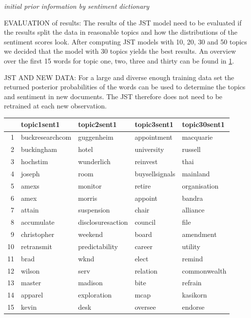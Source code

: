\textit{initial prior information by sentiment dictionary}

EVALUATION of results: The results of the JST model need to be evaluated if the results split the data in reasonable topics and how the distributions of the sentiment scores look. After computing JST models with 10, 20, 30 and 50 topics we decided that the model with 30 topics yields the best results. An overview over the first 15 words for topic one, two, three and thirty can be found in \ref{tab:TopicWordsSent1}. 

JST AND NEW DATA: For a large and diverse enough training data set the returned posterior probabilities of the words can be used to determine the topics and sentiment in new documents. The JST therefore does not need to be retrained at each new observation. 

\begin{table}[ht]
\centering
\begin{tabular}{rllll}
  \hline
 & topic1sent1 & topic2sent1 & topic3sent1 & topic30sent1 \\ 
  \hline
1 & buckresearchcom & guggenheim & appointment & macquarie \\ 
  2 & buckingham & hotel & university & russell \\ 
  3 & hochstim & wunderlich & reinvest & thai \\ 
  4 & joseph & room & buysellsignals & mainland \\ 
  5 & amexs & monitor & retire & organisation \\ 
  6 & amex & morris & appoint & bandra \\ 
  7 & attain & suspension & chair & alliance \\ 
  8 & accumulate & disclosuresaction & council & file \\ 
  9 & christopher & weekend & board & amendment \\ 
  10 & retransmit & predictability & career & utility \\ 
  11 & brad & wknd & elect & remind \\ 
  12 & wilson & serv & relation & commonwealth \\ 
  13 & master & madison & bite & refrain \\ 
  14 & apparel & exploration & mcap & kasikorn \\ 
  15 & kevin & desk & oversee & endorse \\ 
   \hline
\end{tabular}\label{tab:TopicWordsSent1}
\end{table}

